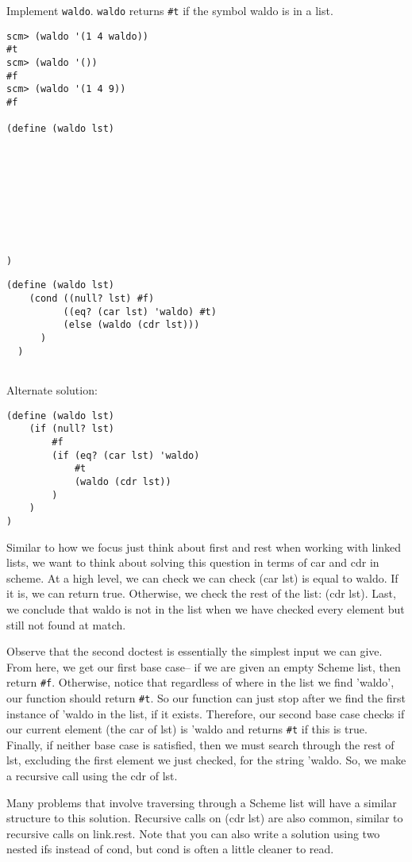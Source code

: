 \begin{blocksection}
\question Implement \texttt{waldo}. \texttt{waldo} returns \texttt{\#t} if the
symbol waldo is in a list. \\

\begin{lstlisting}
scm> (waldo '(1 4 waldo))
#t
scm> (waldo '())
#f
scm> (waldo '(1 4 9))
#f

(define (waldo lst)









)
\end{lstlisting}
\end{blocksection}
\begin{blocksection}
\begin{solution}[0.5in]

\begin{lstlisting}
(define (waldo lst)
    (cond ((null? lst) #f)
          ((eq? (car lst) 'waldo) #t)
          (else (waldo (cdr lst)))
      )
  )


\end{lstlisting}
Alternate solution:
\begin{lstlisting}
(define (waldo lst)
    (if (null? lst)
        #f
        (if (eq? (car lst) 'waldo)
            #t
            (waldo (cdr lst))
        )
    )
)
\end{lstlisting}
Similar to how we focus just think about  first and rest when working with linked lists, we want to think about solving this question in terms of car and cdr in scheme. At a high level, we can check we can check (car lst) is equal to waldo. If it is, we can return true. Otherwise, we check the rest of the list: (cdr lst). Last, we conclude that waldo is not in the list when we have checked every element but still not found at match.

Observe that the second doctest is essentially the simplest input we can give. From here, we get our first base case-- if we are given an empty Scheme list, then return \texttt{\#f}. Otherwise, notice that regardless of where in the list we find 'waldo', our function should return \texttt{\#t}. So our function can just stop after we find the first instance of 'waldo in the list, if it exists. Therefore, our second base case checks if our current element (the car of lst) is 'waldo and returns \texttt{\#t} if this is true. Finally, if neither base case is satisfied, then we must search through the rest of lst, excluding the first element we just checked, for the string 'waldo. So, we make a recursive call using the cdr of lst.

Many problems that involve traversing through a Scheme list will have a similar structure to this solution. Recursive calls on (cdr lst) are also common, similar to recursive calls on link.rest.  Note that you can also write a solution using two nested ifs instead of cond, but cond is often a little cleaner to read.


\end{solution}
\end{blocksection}

